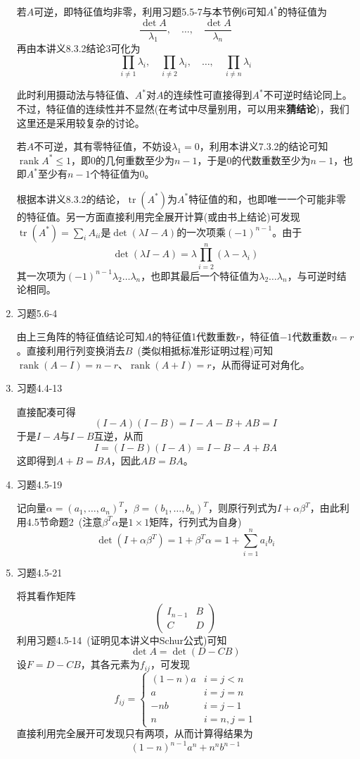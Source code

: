 \documentclass[a4paper,UTF8,fontset=windows]{ctexart}
\DeclareMathOperator{\rank}{rank}
\DeclareMathOperator{\tr}{tr}
\newcommand*{\note}{\noindent *}
\begin{document}
\begin{enumerate}
    若$A$可逆，即特征值均非零，利用习题5.5-7与本节例6可知$A^*$的特征值为
    $$\frac{\det A}{\lambda_1},\quad\dots,\quad\frac{\det A}{\lambda_n}$$
    再由本讲义8.3.2结论3可化为
    $$\prod_{i\ne 1}\lambda_i,\quad\prod_{i\ne 2}\lambda_i,\quad\dots,\quad\prod_{i\ne n}\lambda_i$$
    
    \note 此时利用摄动法与特征值、$A^*$对$A$的连续性可直接得到$A^*$不可逆时结论同上。不过，特征值的连续性并不显然(在考试中尽量别用，可以用来\textbf{猜结论})，我们这里还是采用较复杂的讨论。

    若$A$不可逆，其有零特征值，不妨设$\lambda_1=0$，利用本讲义7.3.2的结论可知$\rank A^*\le1$，即0的几何重数至少为$n-1$，于是0的代数重数至少为$n-1$，也即$A^*$至少有$n-1$个特征值为0。

    根据本讲义8.3.2的结论，$\tr(A^*)$为$A^*$特征值的和，也即唯一一个可能非零的特征值。另一方面直接利用完全展开计算(或由书上结论)可发现$\tr(A^*)=\sum_iA_{ii}$是$\det(\lambda I-A)$的一次项乘$(-1)^{n-1}$。由于
    $$\det(\lambda I-A)=\lambda\prod_{i=2}^n(\lambda-\lambda_i)$$
    其一次项为$(-1)^{n-1}\lambda_2\dots\lambda_n$，也即其最后一个特征值为$\lambda_2\dots\lambda_n$，与可逆时结论相同。


    \item 习题5.6-4
    
    由上三角阵的特征值结论可知$A$的特征值1代数重数$r$，特征值$-1$代数重数$n-r$。直接利用行列变换消去$B$\ (类似相抵标准形证明过程)可知$\rank(A-I)=n-r$、$\rank(A+I)=r$，从而得证可对角化。

    \item 习题4.4-13
    
    直接配凑可得
    $$(I-A)(I-B)=I-A-B+AB=I$$
    于是$I-A$与$I-B$互逆，从而
    $$I=(I-B)(I-A)=I-B-A+BA$$
    这即得到$A+B=BA$，因此$AB=BA$。

    \item 习题4.5-19
    
    记向量$\alpha=(a_1,\dots,a_n)^T$，$\beta=(b_1,\dots,b_n)^T$，则原行列式为$I+\alpha\beta^T$，由此利用4.5节命题2\ (注意$\beta^T\alpha$是$1\times 1$矩阵，行列式为自身)
    $$\det(I+\alpha\beta^T)=1+\beta^T\alpha=1+\sum_{i=1}^na_ib_i$$

    \item 习题4.5-21
    
    将其看作矩阵
    $$\begin{pmatrix}I_{n-1}&B\\C&D\end{pmatrix}$$
    利用习题4.5-14\ (证明见本讲义中Schur公式)可知
    $$\det A=\det(D-CB)$$
    设$F=D-CB$，其各元素为$f_{ij}$，可发现
    $$f_{ij}=\begin{cases}(1-n)a&i=j<n\\a&i=j=n\\-nb&i=j-1\\n&i=n,j=1\end{cases}$$
    直接利用完全展开可发现只有两项，从而计算得结果为
    $$(1-n)^{n-1}a^n+n^nb^{n-1}$$


\end{enumerate}
\end{document}

